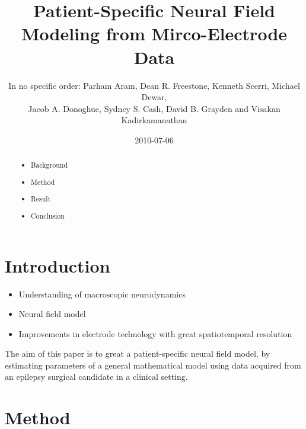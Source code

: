 \documentclass[]{article}
\title{Patient-Specific Neural Field Modeling from Mirco-Electrode Data}
\author{In no specific order: Parham Aram, Dean R. Freestone, Kenneth Scerri, Michael Dewar,\\
 Jacob A. Donoghue, Sydney S. Cash, David B. Grayden and Visakan Kadirkamanathan  }
\date{2010-07-06}
\begin{document}
\ifpdf
{}
\else
{}
\fi

\maketitle


\begin{abstract}
	
	\begin{itemize}
		\item Background
		\item Method
		\item Result
		\item Conclusion
	\end{itemize}
\end{abstract}

\section{Introduction}
\begin{itemize}
	\item Understanding of macroscopic neurodynamics
	\item Neural field model
	\item Improvements in electrode technology with great spatiotemporal resolution
\end{itemize}
The aim of this paper is to great a patient-specific neural field model, by estimating parameters of a general mathematical model using data acquired from an epilepsy surgical candidate in a clinical setting. 
\section{Method}
\end{document}
